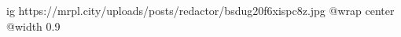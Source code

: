  
 
 
 
 

\ifcmt
  ig https://mrpl.city/uploads/posts/redactor/bsdug20f6xispc8z.jpg
  @wrap center
  @width 0.9
\fi
